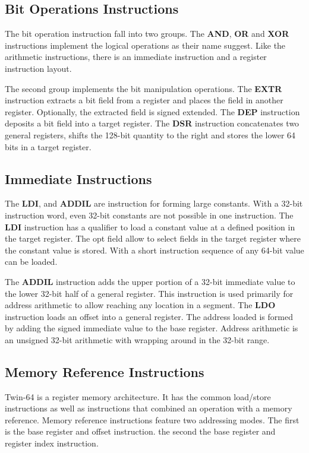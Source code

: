 \subsection*{Bit Operations Instructions}

The bit operation instruction fall into two groups. The 
\textbf{AND}, \textbf{OR} and \textbf{XOR} instructions implement the logical operations as their name suggest. Like the arithmetic instructions, there is an immediate instruction and a register instruction layout.

The second group implements the bit manipulation operations. The \textbf{EXTR} instruction extracts a bit field from a register and places the field in another register. Optionally, the extracted field is signed extended. The \textbf{DEP} instruction deposits a bit field into a target register. The \textbf{DSR} instruction concatenates two general registers, shifts the 128-bit quantity to the right and stores the lower 64 bits in a target register.

\subsection*{Immediate Instructions}

The \textbf{LDI}, and \textbf{ADDIL} are instruction for forming large constants. With a 32-bit instruction word, even 32-bit constants are not possible in one instruction. The \textbf{LDI} instruction has a qualifier to load a constant value at a defined position in the target register. The opt field allow to select fields in the target register where the constant value is stored. With a short instruction sequence of any 64-bit value can be loaded.

The \textbf{ADDIL} instruction adds the upper portion of a 32-bit immediate value to the lower 32-bit half of a general register. This instruction is used primarily for address arithmetic to allow reaching any location in a segment. The \textbf{LDO} instruction loads an offset into a general register. The address loaded is formed by adding the signed immediate value to the base register. Address arithmetic is an unsigned 32-bit arithmetic with wrapping around in the 32-bit range.

\subsection*{Memory Reference Instructions}

Twin-64 is a register memory architecture. It has the common load/store instructions as well as instructions that combined an operation with a memory reference. Memory reference instructions feature two addressing modes. The first is the base register and offset instruction. the second the base register and register index instruction. 

